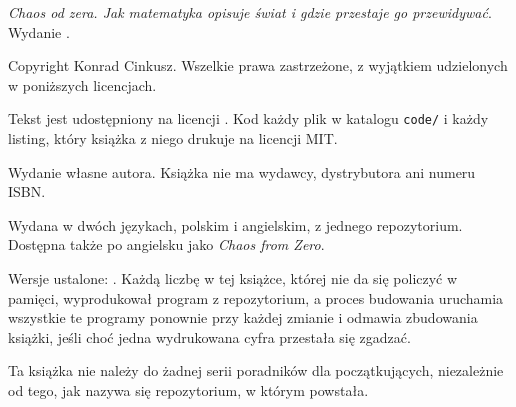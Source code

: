 
\thispagestyle{empty}
\vspace*{\fill}

{\small\color{mgrey}\raggedright\setlength{\parindent}{0pt}%
\emph{Chaos od zera. Jak matematyka opisuje świat i gdzie przestaje go
przewidywać}. Wydanie \bookedition.

\medskip
Copyright \textcopyright{} \bookyear{} Konrad Cinkusz. Wszelkie prawa
zastrzeżone, z wyjątkiem udzielonych w poniższych licencjach.

\medskip
Tekst jest udostępniony na licencji \proselicence{}. Kod \dash{} każdy plik
w katalogu \texttt{code/} i każdy listing, który książka z niego drukuje
\dash{} na licencji MIT.

\medskip
Wydanie własne autora. Książka nie ma wydawcy, dystrybutora ani numeru
ISBN.

\medskip
Wydana w dwóch językach, polskim i angielskim, z jednego repozytorium.
Dostępna także po angielsku jako \emph{Chaos from Zero}.

\medskip
Wersje ustalone: \pinnedon. Każdą liczbę w tej książce, której nie da się
policzyć w pamięci, wyprodukował program z repozytorium, a proces budowania
uruchamia wszystkie te programy ponownie przy każdej zmianie i odmawia
zbudowania książki, jeśli choć jedna wydrukowana cyfra przestała się zgadzać.

\medskip
Ta książka nie należy do żadnej serii poradników dla początkujących,
niezależnie od tego, jak nazywa się repozytorium, w którym powstała.
\par}

\clearpage
